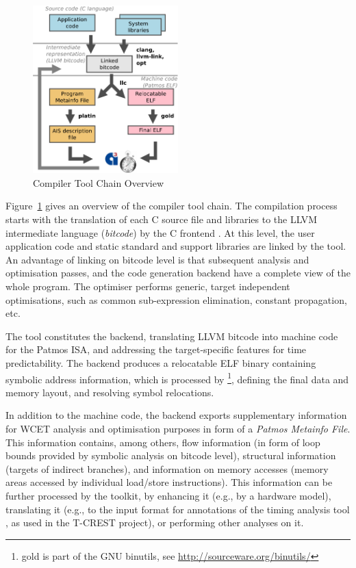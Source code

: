 \begin{figure}[!t]
\centering
\includegraphics[width=0.5\textwidth]{fig/compiler_overview}
\caption{Compiler Tool Chain Overview}
\label{fig:compiler_overview}
\end{figure}


Figure~\ref{fig:compiler_overview} gives an overview of the compiler tool
chain.
The compilation process starts with the translation of each C source file and
libraries to the LLVM intermediate language (\emph{bitcode}) by the C frontend
. At this level, the user application code and static standard
and support libraries are linked by the  tool.
An advantage of linking on bitcode level is that subsequent analysis and
optimisation passes, and the code generation backend have a complete view of
the whole program. The  optimiser performs generic,
target independent optimisations, such as common sub-expression elimination,
constant propagation, etc.

The  tool constitutes the backend, translating LLVM bitcode into
machine code for the Patmos ISA, and addressing the target-specific features
for time predictability.  The backend produces a relocatable ELF binary
containing symbolic address information, which is processed by %
%
\footnote{gold is part of the GNU binutils, see
\url{http://sourceware.org/binutils/}}, defining the final data and memory
layout, and resolving symbol relocations.

In addition to the machine code, the backend exports supplementary information
for WCET analysis and optimisation purposes in form of a \emph{Patmos Metainfo
File}.  This information contains, among others, flow information (in form of
loop bounds provided by symbolic analysis on bitcode level), structural
information (targets of indirect branches), and information on memory accesses
(memory areas accessed by individual load/store instructions).
%
This information can be further processed by the  toolkit, by
enhancing it (e.g., by a hardware model), translating it (e.g., to the input
format for annotations of the timing analysis tool , as used in the
T-CREST project), or performing other analyses on it.





